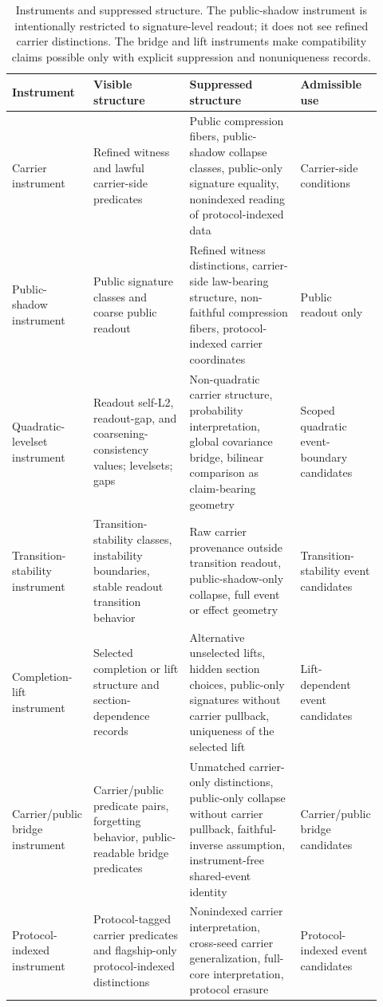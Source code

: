 \documentclass[11pt]{article}
\theoremstyle{definition}
\begin{document}
\begin{table}[t]
\centering
\small
\setlength{\tabcolsep}{4pt}
\begin{tabular}{p{0.20\linewidth}p{0.26\linewidth}p{0.30\linewidth}p{0.16\linewidth}}
\hline
\textbf{Instrument} & \textbf{Visible structure} & \textbf{Suppressed structure} & \textbf{Admissible use} \\
\hline
Carrier instrument
&
Refined witness and lawful carrier-side predicates
&
Public compression fibers, public-shadow collapse classes, public-only signature equality, nonindexed reading of protocol-indexed data
&
Carrier-side conditions
\\[0.5em]
Public-shadow instrument
&
Public signature classes and coarse public readout
&
Refined witness distinctions, carrier-side law-bearing structure, non-faithful compression fibers, protocol-indexed carrier coordinates
&
Public readout only
\\[0.5em]
Quadratic-levelset instrument
&
Readout self-L2, readout-gap, and coarsening-consistency values; levelsets; gaps
&
Non-quadratic carrier structure, probability interpretation, global covariance bridge, bilinear comparison as claim-bearing geometry
&
Scoped quadratic event-boundary candidates
\\[0.5em]
Transition-stability instrument
&
Transition-stability classes, instability boundaries, stable readout transition behavior
&
Raw carrier provenance outside transition readout, public-shadow-only collapse, full event or effect geometry
&
Transition-stability event candidates
\\[0.5em]
Completion-lift instrument
&
Selected completion or lift structure and section-dependence records
&
Alternative unselected lifts, hidden section choices, public-only signatures without carrier pullback, uniqueness of the selected lift
&
Lift-dependent event candidates
\\[0.5em]
Carrier/public bridge instrument
&
Carrier/public predicate pairs, forgetting behavior, public-readable bridge predicates
&
Unmatched carrier-only distinctions, public-only collapse without carrier pullback, faithful-inverse assumption, instrument-free shared-event identity
&
Carrier/public bridge candidates
\\[0.5em]
Protocol-indexed instrument
&
Protocol-tagged carrier predicates and flagship-only protocol-indexed distinctions
&
Nonindexed carrier interpretation, cross-seed carrier generalization, full-core interpretation, protocol erasure
&
Protocol-indexed event candidates
\\
\hline
\end{tabular}
\caption{Instruments and suppressed structure. The public-shadow instrument is intentionally restricted to signature-level readout; it does not see refined carrier distinctions. The bridge and lift instruments make compatibility claims possible only with explicit suppression and nonuniqueness records.}
\label{tab:instruments-suppression}
\end{table}
\end{document}
